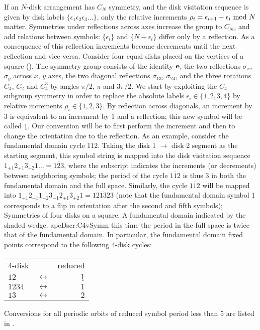 If an $N$-disk arrangement has $C_N$ symmetry, and the disk visitation
sequence is given by disk labels $\{ \epsilon_1 \epsilon_2 \epsilon_3 \dots\}$,
only the relative increments
$\rho_i = \epsilon_{i+1}-\epsilon_{i} \,\, {\rm mod\ } N$ matter.
Symmetries under reflections across axes increase the group to $C_{Nv}$ and
add relations between symbols: $\{\epsilon_i\}$ and $\{N - \epsilon_i\}$
differ only by a reflection. %
As a consequence of this
reflection increments become decrements until the next reflection and
vice versa. Consider four equal disks placed on the vertices
of a square (). The symmetry group consists
of the identity $\bf e$, the two reflections $\sigma_x$, $\sigma_y$
across $x$, $y$ axes, the two diagonal reflections
$\sigma_{13}$, $\sigma_{24}$,
and the three rotations $C_4$, $C_2$ and $C_4^3$ by
angles $\pi/2$, $\pi$ and $3\pi/2$.
We start by exploiting the $C_4$ subgroup symmetry in order to
replace the absolute labels
$\epsilon_i \in \{ 1,2,3,4\}$ by relative increments $\rho_i \in \{ 1,2,3\}$.
By reflection across diagonals, an
increment by $3$ is equivalent to an increment by $1$ and a reflection;
this new symbol will be called $\underline{1}$.
Our convention will be to first perform
the increment and then to change the orientation due to the reflection.
As an example, consider the fundamental domain cycle
$112$. Taking the disk 1 $\rightarrow$
disk 2 segment as the starting segment, this symbol string
is mapped into the disk visitation sequence
$1_{+1} 2_{+1} 3_{+2}1 \dots= \overline{123}$, where the subscript
indicates the increments (or decrements) between neighboring symbols;
the period of the cycle $\overline{112}$
is thus 3 in both the fundamental domain and
the full space. Similarly, the cycle
$\overline{\underline{1}12}$ will be mapped into
$1_{+1} 2_{-1} 1_{-2} 3_{-1} 2_{+1} 3_{+2}1= \overline{121323}$
(note that the fundamental domain symbol $\underline{1}$
corresponds to a flip in orientation
after the second and fifth symbols);
%
{}{
Symmetries of four disks on a square.
A fundamental domain indicated by the shaded wedge.
}
{apeDscr:C4vSymm}
%
this time the period in the full space
is twice that of the fundamental domain. In particular, the
fundamental domain fixed points correspond to the following
4-disk cycles:
\vskip 12pt
\begin{center}
\begin{tabular}{lcr}
4-disk            &                    & reduced \\
$ {12} $ & $ \leftrightarrow $ & $ {\underline{1}} $ \\
$ {1234} $ & $ \leftrightarrow $ & $ {1} $ \\
$ {13} $ & $ \leftrightarrow $ & $ {2} $
\end{tabular}
\end{center}
\vskip 12pt
Conversions for all periodic orbits of reduced symbol period
less than 5 are listed in .

